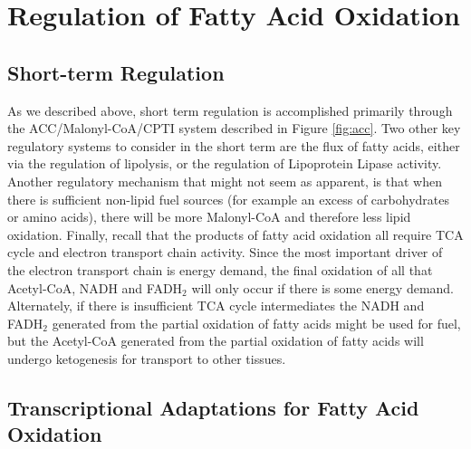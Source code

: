\documentclass{tufte-handout}
\begin{document}
\section{Regulation of Fatty Acid Oxidation}

\subsection{Short-term Regulation}

As we described above, short term regulation is accomplished primarily through the ACC/Malonyl-CoA/CPTI system described in Figure \ref{fig:acc}.  Two other key regulatory systems to consider in the short term are the flux of fatty acids, either via the regulation of lipolysis, or the regulation of Lipoprotein Lipase activity.  Another regulatory mechanism that might not seem as apparent, is that when there is sufficient non-lipid fuel sources (for example an excess of carbohydrates or amino acids), there will be more Malonyl-CoA and therefore less lipid oxidation.  Finally, recall that the products of fatty acid oxidation all require TCA cycle and electron transport chain activity.  Since the most important driver of the electron transport chain is energy demand, the final oxidation of all that Acetyl-CoA, NADH and FADH$_2$ will only occur if there is some energy demand.   Alternately, if there is insufficient TCA cycle intermediates the NADH and FADH$_2$ generated from the partial oxidation of fatty acids might be used for fuel, but the Acetyl-CoA generated from the partial oxidation of fatty acids will undergo ketogenesis for transport to other tissues.

\subsection{Transcriptional Adaptations for Fatty Acid Oxidation}
\end{document}
